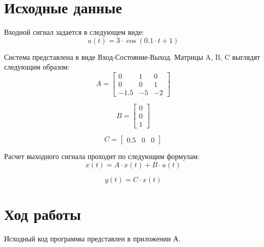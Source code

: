 \documentclass[14pt,a4paper]{extreport}
\begin{document}
\newpage
\chapter*{Исходные данные}

Входной сигнал задается в следующем виде:
\begin{equation}
    u(t) = 3 \cdot  \cos{(0.1 \cdot t + 1)}
\end{equation}

Система представлена в виде Вход-Состояние-Выход. Матрицы A, B, C выглядят следующим образом:
\begin{equation}
    A = 
    \begin{bmatrix} 
        0 & 1 & 0 \\ 
        0 & 0 & 1 \\
        -1.5 & -5 & -2
    \end{bmatrix}
\end{equation}

\begin{equation}
    B = 
    \begin{bmatrix} 
        0 \\ 
        0 \\
        1
    \end{bmatrix}
\end{equation}

\begin{equation}
    C = 
    \begin{bmatrix} 
        0.5 & 0 & 0
    \end{bmatrix}
\end{equation}

Расчет выходного сигнала проходит по следующим формулам:
\begin{equation}
\dot x(t) = A \cdot x(t) + B \cdot u(t)
\end{equation}

\begin{equation}
y(t) = C \cdot x(t)
\end{equation}

\chapter*{Ход работы}
Исходный код программы представлен в приложении А. 
\end{document}
